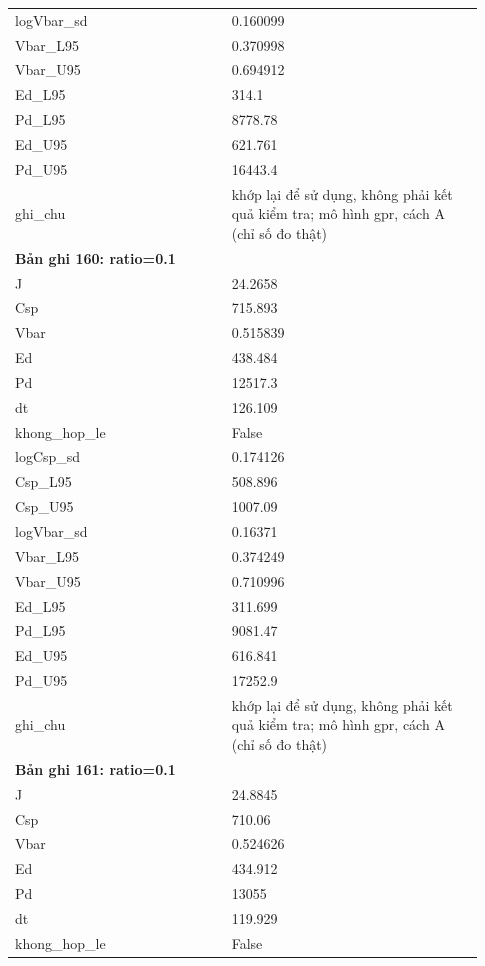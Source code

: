 \begin{longtable}{p{0.43\linewidth}p{0.50\linewidth}}
logVbar\_\allowbreak sd & 0.160099 \\
Vbar\_\allowbreak L95 & 0.370998 \\
Vbar\_\allowbreak U95 & 0.694912 \\
Ed\_\allowbreak L95 & 314.1 \\
Pd\_\allowbreak L95 & 8778.78 \\
Ed\_\allowbreak U95 & 621.761 \\
Pd\_\allowbreak U95 & 16443.4 \\
ghi\_\allowbreak chu & khớp lại để sử dụng, không phải kết quả kiểm tra; mô hình gpr, cách A (chỉ số đo thật) \\
\midrule
\multicolumn{2}{p{0.95\linewidth}}{\textbf{Bản ghi 160: ratio=0.1}} \\
J & 24.2658 \\
Csp & 715.893 \\
Vbar & 0.515839 \\
Ed & 438.484 \\
Pd & 12517.3 \\
dt & 126.109 \\
khong\_\allowbreak hop\_\allowbreak le & False \\
logCsp\_\allowbreak sd & 0.174126 \\
Csp\_\allowbreak L95 & 508.896 \\
Csp\_\allowbreak U95 & 1007.09 \\
logVbar\_\allowbreak sd & 0.16371 \\
Vbar\_\allowbreak L95 & 0.374249 \\
Vbar\_\allowbreak U95 & 0.710996 \\
Ed\_\allowbreak L95 & 311.699 \\
Pd\_\allowbreak L95 & 9081.47 \\
Ed\_\allowbreak U95 & 616.841 \\
Pd\_\allowbreak U95 & 17252.9 \\
ghi\_\allowbreak chu & khớp lại để sử dụng, không phải kết quả kiểm tra; mô hình gpr, cách A (chỉ số đo thật) \\
\midrule
\multicolumn{2}{p{0.95\linewidth}}{\textbf{Bản ghi 161: ratio=0.1}} \\
J & 24.8845 \\
Csp & 710.06 \\
Vbar & 0.524626 \\
Ed & 434.912 \\
Pd & 13055 \\
dt & 119.929 \\
khong\_\allowbreak hop\_\allowbreak le & False \\

\end{longtable}
